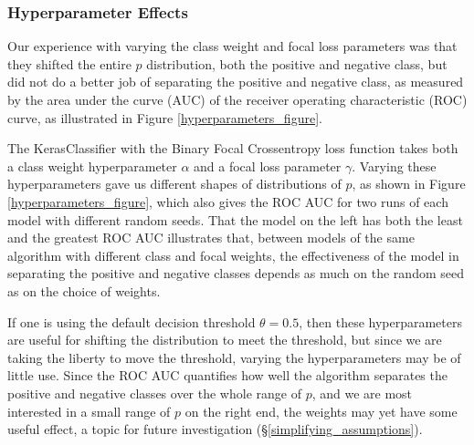 \FloatBarrier

\subsubsection{Hyperparameter Effects}
\label{hyperparameters}

Our experience with varying the class weight and focal loss parameters was that they shifted the entire $p$ distribution, both the positive and negative class, but did not do a better job of separating the positive and negative class, as measured by the area under the curve (AUC) of the receiver operating characteristic (ROC) curve, as illustrated in Figure \ref{hyperparameters_figure}.  

The KerasClassifier with the Binary Focal Crossentropy loss function takes both a class weight hyperparameter $\alpha$ and a focal loss parameter $\gamma$.  Varying these hyperparameters gave us different shapes of distributions of $p$, as shown in Figure \ref{hyperparameters_figure}, which also gives the ROC AUC for two runs of each model with different random seeds.  That the model on the left has both the least and the greatest ROC AUC illustrates that, between models of the same algorithm with different class and focal weights, the effectiveness of the model in separating the positive and negative classes depends as much on the random seed as on the choice of weights.  

If one is using the default decision threshold $\theta = 0.5$, then these hyperparameters are useful for shifting the distribution to meet the threshold, but since we are taking the liberty to move the threshold, varying the hyperparameters may be of little use.  Since the ROC AUC quantifies how well the algorithm separates the positive and negative classes over the whole range of $p$, and we are most interested in a small range of $p$ on the right end, the weights may yet have some useful effect, a topic for future investigation (\S\ref{simplifying_assumptions}).

